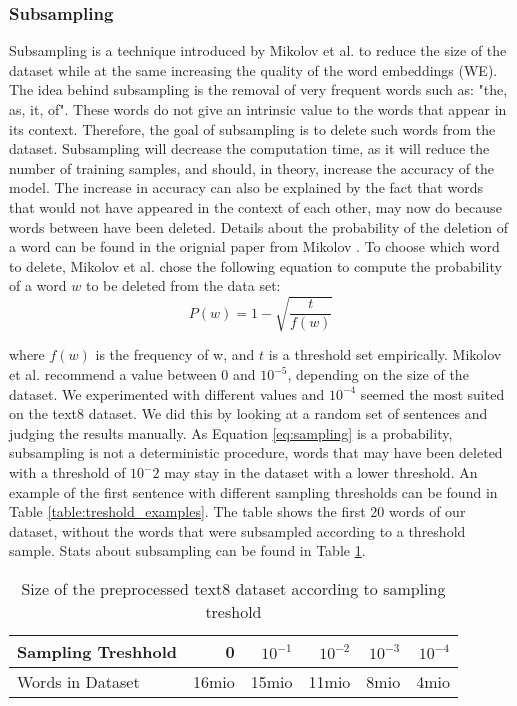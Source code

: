 \subsubsection{Subsampling}
Subsampling is a technique introduced by Mikolov et al. \citep{mikolov} to reduce the size of the dataset while at the same increasing the quality of the word embeddings (WE). The idea behind subsampling is the removal of very frequent words such as: "the, as, it, of". These words do not give an intrinsic value to the words that appear in its context. Therefore, the goal of subsampling is to delete such words from the dataset. Subsampling will decrease the computation time, as it will reduce the number of training samples, and should, in theory, increase the accuracy of the model. The increase in accuracy can also be explained by the fact that words that would not have appeared in the context of each other, may now do because words between have been deleted. 
Details about the probability of the deletion of a word can be found in the orignial paper from Mikolov \citep{mikolov2}.
\iffalse
To choose which word to delete, Mikolov et al. \citep{mikolov2} chose the following equation to compute the probability of a word $w$  to be deleted from the data set:
\begin{equation} \label{eq:sampling}
P(w) = 1- \sqrt{{\frac{t}{f(w)}}}
\end{equation}

where $f(w)$ is the frequency of w, and $t$ is a threshold set empirically. Mikolov et al. recommend a value between $0$ and $10^{-5}$, depending on the size of the dataset. We experimented with different values and $10^{-4}$ seemed the most suited on the text8 dataset. We did this by looking at a random set of sentences and judging the results manually. 
As Equation \ref{eq:sampling} is a probability, subsampling is not a deterministic procedure, words that may have been deleted with a threshold of $10^-2$ may stay in the dataset with a lower threshold. 
An example of the first sentence with different sampling thresholds can be found in Table \ref{table:treshold_examples}. The table shows the first 20 words of our dataset, without the words that were subsampled according to a threshold sample. Stats about subsampling can be found in Table \ref{table:threshold}.
\begin{table}[tb]
\caption{Size of the preprocessed text8 dataset according to sampling treshold}
    \begin{tabular}{l r r r r r}%
        \toprule
Sampling Treshhold & 0 & $ 10^{-1}$&$ 10^{-2}$& $10^{-3} $ &$10^{-4} $ \\ 
        \midrule%
Words in Dataset  & 16mio & 15mio & 11mio & 8mio & 4mio \\ 
        \bottomrule%
   \end{tabular}%
   \label{table:threshold}%
\end{table}

